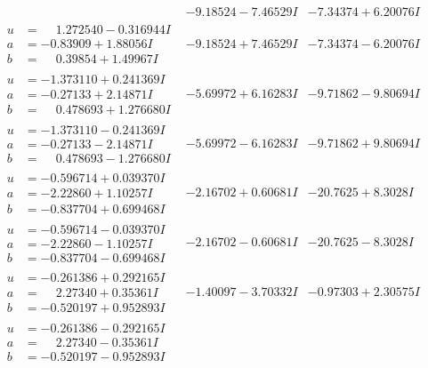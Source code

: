 \documentclass[1p]{elsarticle_modified}
\theoremstyle{definition}
\begin{document}
$$\begin{array}{c|c|c}
 & -9.18524 - 7.46529 I & -7.34374 + 6.20076 I \\ \hline\begin{aligned}
u &= \phantom{-}1.272540 - 0.316944 I \\
a &= -0.83909 + 1.88056 I \\
b &= \phantom{-}0.39854 + 1.49967 I\end{aligned}
 & -9.18524 + 7.46529 I & -7.34374 - 6.20076 I \\ \hline\begin{aligned}
u &= -1.373110 + 0.241369 I \\
a &= -0.27133 + 2.14871 I \\
b &= \phantom{-}0.478693 + 1.276680 I\end{aligned}
 & -5.69972 + 6.16283 I & -9.71862 - 9.80694 I \\ \hline\begin{aligned}
u &= -1.373110 - 0.241369 I \\
a &= -0.27133 - 2.14871 I \\
b &= \phantom{-}0.478693 - 1.276680 I\end{aligned}
 & -5.69972 - 6.16283 I & -9.71862 + 9.80694 I \\ \hline\begin{aligned}
u &= -0.596714 + 0.039370 I \\
a &= -2.22860 + 1.10257 I \\
b &= -0.837704 + 0.699468 I\end{aligned}
 & -2.16702 + 0.60681 I & -20.7625 + 8.3028 I \\ \hline\begin{aligned}
u &= -0.596714 - 0.039370 I \\
a &= -2.22860 - 1.10257 I \\
b &= -0.837704 - 0.699468 I\end{aligned}
 & -2.16702 - 0.60681 I & -20.7625 - 8.3028 I \\ \hline\begin{aligned}
u &= -0.261386 + 0.292165 I \\
a &= \phantom{-}2.27340 + 0.35361 I \\
b &= -0.520197 + 0.952893 I\end{aligned}
 & -1.40097 - 3.70332 I & -0.97303 + 2.30575 I \\ \hline\begin{aligned}
u &= -0.261386 - 0.292165 I \\
a &= \phantom{-}2.27340 - 0.35361 I \\
b &= -0.520197 - 0.952893 I\end{aligned}

\end{array}$$
\end{document}
